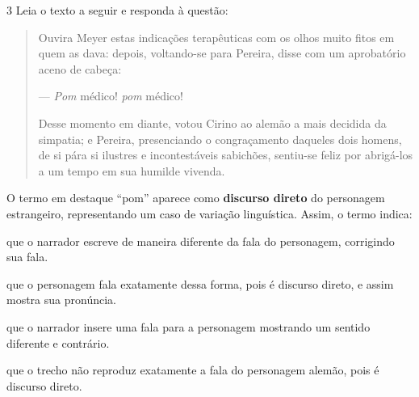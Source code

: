 \num{3} Leia o texto a seguir e responda à questão:

\begin{quote}
Ouvira Meyer estas indicações terapêuticas com os olhos muito fitos em
quem as dava: depois, voltando-se para Pereira, disse com um aprobatório
aceno de cabeça:

--- \emph{Pom} médico! \emph{pom} médico!

Desse momento em diante, votou Cirino ao alemão a mais decidida da
simpatia; e Pereira, presenciando o congraçamento daqueles dois homens,
de si pára si ilustres e incontestáveis sabichões, sentiu-se feliz por
abrigá-los a um tempo em sua humilde vivenda.

\end{quote}

O termo em destaque ``pom'' aparece como \textbf{discurso direto} do
personagem estrangeiro, representando um caso de variação linguística.
Assim, o termo indica:

\begin{escolha}
\item que o narrador escreve de maneira diferente da fala do personagem,
corrigindo sua fala.

\item que o personagem fala exatamente dessa forma, pois é discurso direto,
e assim mostra sua pronúncia.

\item que o narrador insere uma fala para a personagem mostrando um sentido
diferente e contrário.

\item que o trecho não reproduz exatamente a fala do personagem alemão,
pois é discurso direto.
\end{escolha}


